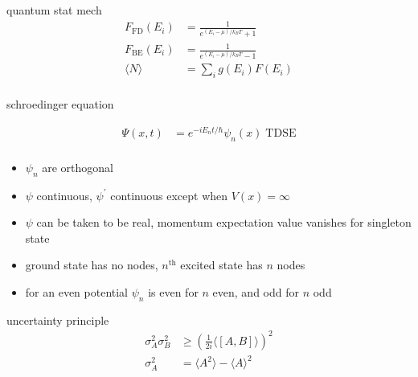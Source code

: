 \documentclass[avery5388, frame]{flashcards}
\begin{document}
\begin{flashcard}{quantum stat mech}
  {
    \begin{align*}
      F_{\textrm{FD}}(E_{i}) &= \frac{1}{e^{(E_{i} - \mu) / k_{B} T} + 1}\\
      F_{\textrm{BE}}(E_{i}) &= \frac{1}{e^{(E_{i} - \mu) / k_{B} T} - 1}\\
      \langle N \rangle &= \sum_{i} g(E_{i}) F(E_{i})\\
    \end{align*}
  }
\end{flashcard}


\begin{flashcard}{schroedinger equation}
  {
    \begin{align*}
      \Psi(x, t) &= e^{-iE_{n}t/\hbar} \psi_{n}(x) \; \textrm{TDSE}\\
    \end{align*}
    
    \begin{itemize}
    \item $\psi_{n}$ are orthogonal
    \item $\psi$ continuous, $\psi^{'}$ continuous except when $V(x) = \infty$
    \item $\psi$ can be taken to be real, momentum expectation value vanishes for singleton state
    \item ground state has no nodes, $n^{\textrm{th}}$ excited state has $n$ nodes
    \item for an even potential $\psi_{n}$ is even for $n$ even, and odd for $n$ odd
    \end{itemize}
  }
\end{flashcard}

\begin{flashcard}{uncertainty principle}
  {
    \begin{align*}
      \sigma_{A}^{2} \sigma_{B}^{2} &\ge (\frac{1}{2i} \langle [A, B] \rangle)^{2}\\
      \sigma_{A}^{2} &= \langle A^{2} \rangle - {\langle A \rangle}^{2}
    \end{align*}
  }
\end{flashcard}
\end{document}
